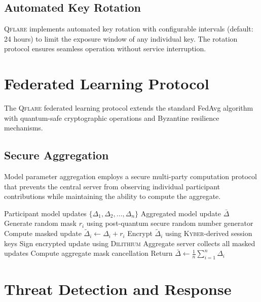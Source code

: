 ﻿\documentclass[12pt,a4paper,twoside]{book}
\newcommand{\qflare}{\textsc{Qflare}}
\newcommand{\kyber}{\textsc{Kyber}}
\newcommand{\dilithium}{\textsc{Dilithium}}
\begin{document}
\subsection{Automated Key Rotation}
\label{subsec:key-rotation}

\qflare{} implements automated key rotation with configurable intervals (default: 24 hours) to limit the exposure window of any individual key. The rotation protocol ensures seamless operation without service interruption.

\section{Federated Learning Protocol}
\label{sec:fl-protocol}

The \qflare{} federated learning protocol extends the standard FedAvg algorithm with quantum-safe cryptographic operations and Byzantine resilience mechanisms.

\subsection{Secure Aggregation}
\label{subsec:secure-aggregation}

Model parameter aggregation employs a secure multi-party computation protocol that prevents the central server from observing individual participant contributions while maintaining the ability to compute the aggregate.

\begin{algorithm}
\caption{Quantum-Safe Secure Aggregation}
\label{alg:secure-aggregation}
\begin{algorithmic}[1]
\REQUIRE Participant model updates $\{\Delta_1, \Delta_2, \ldots, \Delta_n\}$
\ENSURE Aggregated model update $\bar{\Delta}$
    \STATE Generate random mask $r_i$ using post-quantum secure random number generator
    \STATE Compute masked update $\tilde{\Delta}_i \leftarrow \Delta_i + r_i$
    \STATE Encrypt $\tilde{\Delta}_i$ using \kyber{}-derived session keys
    \STATE Sign encrypted update using \dilithium{}
\ENDFOR
\STATE Aggregate server collects all masked updates
\STATE Compute aggregate mask cancellation
\STATE Return $\bar{\Delta} \leftarrow \frac{1}{n}\sum_{i=1}^n \Delta_i$
\end{algorithmic}
\end{algorithm}

\section{Threat Detection and Response}
\label{sec:threat-detection}
\end{document}
